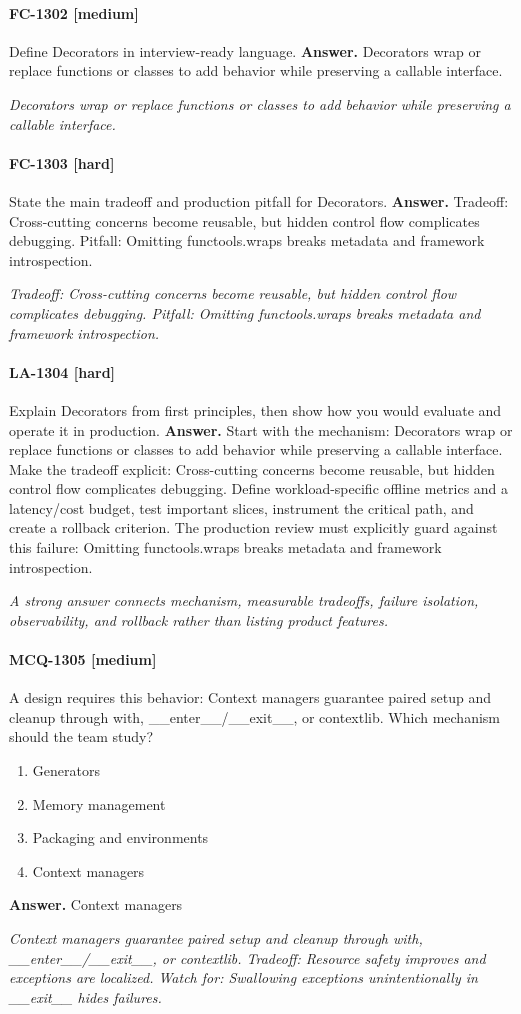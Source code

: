 \paragraph{FC-1302 [medium]} Define Decorators in interview-ready language.
\noindent\textbf{Answer.} Decorators wrap or replace functions or classes to add behavior while preserving a callable interface.
\par\textit{Decorators wrap or replace functions or classes to add behavior while preserving a callable interface.}
\paragraph{FC-1303 [hard]} State the main tradeoff and production pitfall for Decorators.
\noindent\textbf{Answer.} Tradeoff: Cross-cutting concerns become reusable, but hidden control flow complicates debugging. Pitfall: Omitting functools.wraps breaks metadata and framework introspection.
\par\textit{Tradeoff: Cross-cutting concerns become reusable, but hidden control flow complicates debugging. Pitfall: Omitting functools.wraps breaks metadata and framework introspection.}
\paragraph{LA-1304 [hard]} Explain Decorators from first principles, then show how you would evaluate and operate it in production.
\noindent\textbf{Answer.} Start with the mechanism: Decorators wrap or replace functions or classes to add behavior while preserving a callable interface. Make the tradeoff explicit: Cross-cutting concerns become reusable, but hidden control flow complicates debugging. Define workload-specific offline metrics and a latency/cost budget, test important slices, instrument the critical path, and create a rollback criterion. The production review must explicitly guard against this failure: Omitting functools.wraps breaks metadata and framework introspection.
\par\textit{A strong answer connects mechanism, measurable tradeoffs, failure isolation, observability, and rollback rather than listing product features.}
\paragraph{MCQ-1305 [medium]} A design requires this behavior: Context managers guarantee paired setup and cleanup through with, \_\_enter\_\_/\_\_exit\_\_, or contextlib. Which mechanism should the team study?
\begin{enumerate}[label=\Alph*.]
\item Generators
\item Memory management
\item Packaging and environments
\item Context managers
\end{enumerate}
\noindent\textbf{Answer.} Context managers
\par\textit{Context managers guarantee paired setup and cleanup through with, \_\_enter\_\_/\_\_exit\_\_, or contextlib. Tradeoff: Resource safety improves and exceptions are localized. Watch for: Swallowing exceptions unintentionally in \_\_exit\_\_ hides failures.}
